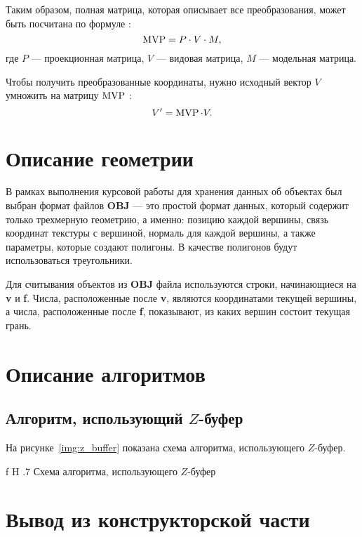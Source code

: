 Таким образом, полная матрица, которая описывает все преобразования, может быть посчитана по формуле \cite{Jeremiah2011}:
\begin{equation}
\operatorname{MVP} = P \cdot V \cdot M,
\end{equation}
где $P$ --- проекционная матрица, $V$ --- видовая матрица, $M$ --- модельная матрица.

Чтобы получить преобразованные координаты, нужно исходный вектор $V$ умножить на матрицу $\operatorname{MVP}$ \cite{Jeremiah2011}:
\begin{equation}
V' = \operatorname{MVP} \cdot V.
\end{equation}
    
\section{Описание геометрии}
\label{sec:geometry}

В рамках выполнения курсовой работы для хранения данных об объектах был выбран формат файлов \textbf{OBJ} --- это простой формат данных, который содержит только трехмерную геометрию, а именно: позицию каждой вершины, связь координат текстуры с вершиной, нормаль для каждой вершины, а также параметры, которые создают полигоны. 
В качестве полигонов будут использоваться треугольники.

Для считывания объектов из \textbf{OBJ} файла используются строки, начинающиеся на \textbf{v} и \textbf{f}. 
Числа, расположенные после \textbf{v}, являются координатами текущей вершины, а числа, расположенные после \textbf{f}, показывают, из каких вершин состоит текущая грань.

\section{Описание алгоритмов}

\subsection*{Алгоритм, использующий $Z$-буфер}

На рисунке~\ref{img:z_buffer} показана схема алгоритма, использующего $Z$-буфер.

    {f}
    {H}
    {.7\textwidth}
    {Схема алгоритма, использующего $Z$-буфер}

\section*{Вывод из конструкторской части}

